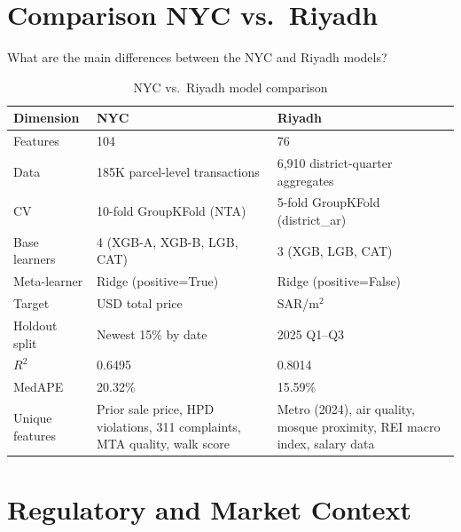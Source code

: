 \documentclass[11pt, a4paper, twoside]{article}
\begin{document}
\section{Comparison NYC vs.\ Riyadh}
\label{sec:compare}

\begin{question}{What are the main differences between the NYC and Riyadh models?}
\end{question}

\begin{table}[H]
  \centering
  \caption{NYC vs.\ Riyadh model comparison}
  \label{tab:compare}
  \begin{tabular}{p{4cm}p{5cm}p{5cm}}
    \toprule
    Dimension & NYC & Riyadh \\
    \midrule
    Features          & 104             & 76 \\
    Data              & 185K parcel-level transactions & 6,910 district-quarter aggregates \\
    CV                & 10-fold GroupKFold (NTA) & 5-fold GroupKFold (district\_ar) \\
    Base learners     & 4 (XGB-A, XGB-B, LGB, CAT) & 3 (XGB, LGB, CAT) \\
    Meta-learner      & Ridge (positive=True) & Ridge (positive=False) \\
    Target            & USD total price & SAR/m$^2$ \\
    Holdout split     & Newest 15\% by date & 2025 Q1--Q3 \\
    $R^2$             & 0.6495 & 0.8014 \\
    MedAPE            & 20.32\% & 15.59\% \\
    Unique features   & Prior sale price, HPD violations, 311 complaints, MTA quality, walk score & Metro (2024), air quality, mosque proximity, REI macro index, salary data \\
    \bottomrule
  \end{tabular}
\end{table}

\section{Regulatory and Market Context}
\label{sec:regulatory}
\end{document}
